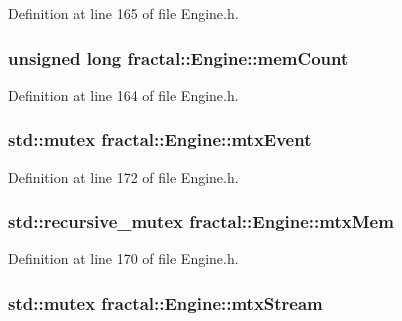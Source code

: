 Definition at line 165 of file Engine.\+h.

\hypertarget{classfractal_1_1Engine_ad501516877aed3b1b94e4fac892c3697}{
\subsubsection[{mem\+Count}]{\setlength{\rightskip}{0pt plus 5cm}unsigned long fractal\+::\+Engine\+::mem\+Count\hspace{0.3cm}{\ttfamily [protected]}}}\label{classfractal_1_1Engine_ad501516877aed3b1b94e4fac892c3697}


Definition at line 164 of file Engine.\+h.

\hypertarget{classfractal_1_1Engine_a6f2ce328aab974d9e5e7b45e956ed099}{
\subsubsection[{mtx\+Event}]{\setlength{\rightskip}{0pt plus 5cm}std\+::mutex fractal\+::\+Engine\+::mtx\+Event\hspace{0.3cm}{\ttfamily [protected]}}}\label{classfractal_1_1Engine_a6f2ce328aab974d9e5e7b45e956ed099}


Definition at line 172 of file Engine.\+h.

\hypertarget{classfractal_1_1Engine_a8632cb104e50c26b60b0981d6f054663}{
\subsubsection[{mtx\+Mem}]{\setlength{\rightskip}{0pt plus 5cm}std\+::recursive\+\_\+mutex fractal\+::\+Engine\+::mtx\+Mem\hspace{0.3cm}{\ttfamily [protected]}}}\label{classfractal_1_1Engine_a8632cb104e50c26b60b0981d6f054663}


Definition at line 170 of file Engine.\+h.

\hypertarget{classfractal_1_1Engine_a55a0dd26d3982ace0575a3b83fd8d711}{
\subsubsection[{mtx\+Stream}]{\setlength{\rightskip}{0pt plus 5cm}std\+::mutex fractal\+::\+Engine\+::mtx\+Stream\hspace{0.3cm}{\ttfamily [protected]}}}\label{classfractal_1_1Engine_a55a0dd26d3982ace0575a3b83fd8d711}


